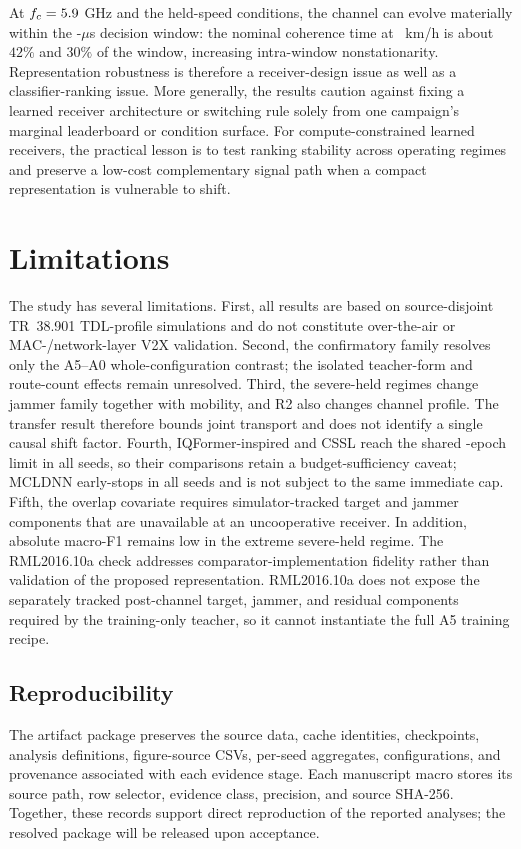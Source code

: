 \documentclass[letterpaper,journal]{IEEEtran}
\begin{document}
At $f_c=5.9$ GHz and the held-speed conditions, the channel can evolve
materially within the \WindowMicroseconds-$\mu$s decision window: the nominal
coherence time at \HeldSpeeds\ km/h is about $42\%$ and $30\%$ of the window,
increasing intra-window nonstationarity. Representation robustness is
therefore a receiver-design issue as well as a classifier-ranking issue. More
generally, the results caution against fixing a learned receiver architecture
or switching rule solely from one campaign's marginal leaderboard or condition
surface. For compute-constrained learned receivers, the practical lesson is to
test ranking stability across operating regimes and preserve a low-cost
complementary signal path when a compact representation is vulnerable to
shift.

\section{Limitations}
The study has several limitations. First, all results are based on
\mbox{source-disjoint} TR~38.901 TDL-profile simulations and do not
constitute over-the-air or MAC-/network-layer V2X validation. Second, the
confirmatory family resolves only the A5--A0 whole-configuration contrast; the
isolated teacher-form and route-count effects remain unresolved.
Third, the severe-held regimes change jammer family together with mobility,
and R2 also changes channel profile. The transfer result therefore bounds
joint transport and does not identify a single causal shift factor. Fourth,
IQFormer-inspired and CSSL reach the shared \TrainEpochs-epoch limit in all
seeds, so their comparisons retain a budget-sufficiency caveat; MCLDNN
early-stops in all seeds and is not subject to the same immediate cap. Fifth,
the overlap covariate requires simulator-tracked target and jammer components
that are unavailable at an uncooperative receiver. In addition, absolute
macro-F1 remains low in the extreme severe-held regime. The RML2016.10a check
addresses comparator-implementation fidelity rather than validation of the
proposed representation.
RML2016.10a does not expose the separately tracked post-channel target, jammer,
and residual components required by the training-only teacher, so it cannot
instantiate the full A5 training recipe.

\subsection*{Reproducibility}
The artifact package preserves the source data, cache identities, checkpoints,
analysis definitions, figure-source CSVs, per-seed aggregates, configurations,
and provenance associated with each evidence stage. Each manuscript macro
stores its source path, row selector, evidence class, precision, and source
SHA-256. Together, these records support direct reproduction of the reported
analyses; the resolved package will be released upon acceptance.
\end{document}
